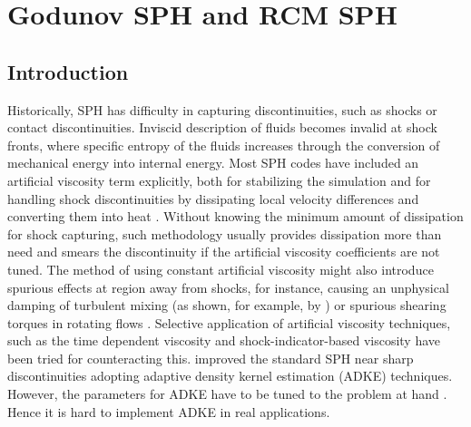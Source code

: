 \chapter{Godunov SPH and RCM SPH}

\section{Introduction}
Historically, SPH has difficulty in capturing discontinuities, such as shocks or contact discontinuities. Inviscid description of fluids becomes invalid at shock fronts, where specific entropy of the fluids increases through the conversion of mechanical energy into internal energy. Most SPH codes have included an artificial viscosity term explicitly, both for stabilizing the simulation and for handling shock discontinuities by dissipating local velocity differences and converting them into heat \citep{monaghan1983shock, monaghan1997sph, klapp2012strong}. Without knowing the minimum amount of dissipation for shock capturing, such methodology usually provides dissipation more than need and smears the discontinuity if the artificial viscosity coefficients are not tuned. The method of using constant artificial viscosity might also introduce spurious effects at region away from shocks, for instance, causing an unphysical damping of turbulent mixing (as shown, for example, by \citet{borgani2012hydrodynamic}) or spurious
shearing torques in rotating flows \citep{flebbe1994smoothed}. Selective application of artificial viscosity techniques, such as the time dependent viscosity \citep{morris1997switch, dolag2005turbulent} and shock-indicator-based viscosity \citep{cullen2010inviscid} have been tried for counteracting this. 
\citet{sigalotti2008adaptive} improved the standard SPH near sharp discontinuities adopting adaptive density kernel estimation (ADKE) techniques. However, the parameters for ADKE have to be tuned to the problem at hand \citep{puri2014comparison}. Hence it is hard to implement ADKE in real applications.

